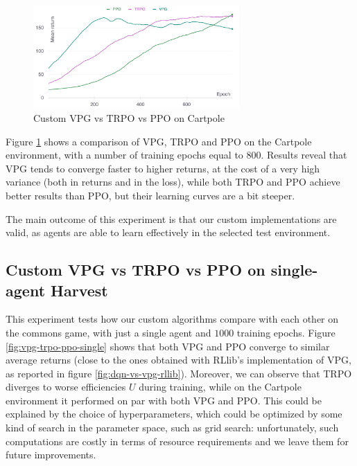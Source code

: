 \documentclass{article}
\begin{document}
\begin{figure}[h]
  \centering
  \includegraphics[width=0.7\textwidth]{../assets/cartpole-pg-return}
  \caption{Custom VPG vs TRPO vs PPO on Cartpole}
  \label{fig:cartpole-pg-return}
\end{figure}

Figure \ref{fig:cartpole-pg-return} shows a comparison of VPG, TRPO and PPO on the Cartpole environment, with a number of training epochs equal to $800$. Results reveal that VPG tends to converge faster to higher returns, at the cost of a very high variance (both in returns and in the loss), while both TRPO and PPO achieve better results than PPO, but their learning curves are a bit steeper. 

The main outcome of this experiment is that our custom implementations are valid, as agents are able to learn effectively in the selected test environment.

\subsection{Custom VPG vs TRPO vs PPO on single-agent Harvest}
This experiment tests how our custom algorithms compare with each other on the commons game, with just a single agent and $1000$ training epochs. Figure \ref{fig:vpg-trpo-ppo-single} shows that both VPG and PPO converge to similar average returns (close to the ones obtained with RLlib's implementation of VPG, as reported in figure \ref{fig:dqn-vs-vpg-rllib}). Moreover, we can observe that TRPO diverges to worse efficiencies $U$ during training, while on the Cartpole environment it performed on par with both VPG and PPO. This could be explained by the choice of hyperparameters, which could be optimized by some kind of search in the parameter space, such as grid search: unfortunately, such computations are costly in terms of resource requirements and we leave them for future improvements.
\end{document}
